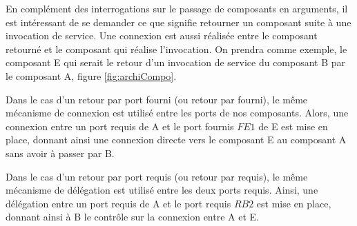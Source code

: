       En complément des interrogations sur le passage de composants en arguments, il est intéressant de se demander ce que signifie retourner un composant suite à une invocation de service. Une connexion est aussi réalisée entre le composant retourné et le composant qui réalise l'invocation. On prendra comme exemple, le composant E qui serait le retour d'un invocation de service du composant B par le composant A, figure \ref{fig:archiCompo}.
  
      Dans le cas d'un retour par port fourni (ou retour par fourni), le même mécanisme de connexion est utilisé entre les ports de nos composants. Alors, une connexion entre un port requis de A et le port fournis $FE1$ de E est mise en place, donnant ainsi une connexion directe vers le composant E au composant A sans avoir à passer par B. 
  
      Dans le cas d'un retour par port requis (ou retour par requis), le même mécanisme de délégation est utilisé entre les deux ports requis. Ainsi, une délégation entre un port requis de A et le port requis $RB2$ est mise en place, donnant ainsi à B le contrôle sur la connexion entre A et E.
         
